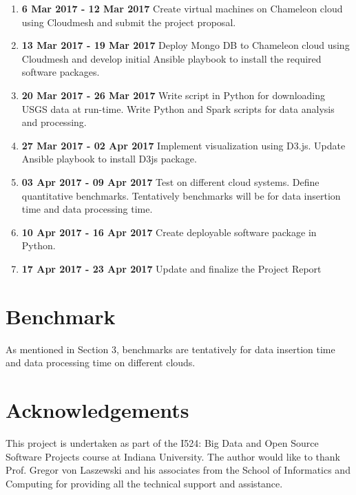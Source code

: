 \documentclass[9pt,twocolumn,twoside]{../../styles/osajnl}
\begin{document}
\begin{enumerate}

\item {\bfseries 6 Mar 2017 - 12 Mar 2017} Create virtual machines on Chameleon
cloud using Cloudmesh and submit the project proposal.

\item {\bfseries 13 Mar 2017 - 19 Mar 2017} Deploy Mongo DB to Chameleon
cloud using Cloudmesh and develop initial Ansible playbook to install the required software packages.

\item {\bfseries 20 Mar 2017 - 26 Mar 2017} Write script in Python for downloading USGS data at run-time. Write Python and Spark scripts for data analysis and processing.  

\item {\bfseries 27 Mar 2017 - 02 Apr 2017} Implement visualization using D3.js. Update Ansible playbook to install D3js package. 

\item {\bfseries 03 Apr 2017 - 09 Apr 2017} Test on different cloud systems. Define quantitative benchmarks. Tentatively benchmarks will be for data insertion time and data processing time.

\item {\bfseries 10 Apr 2017 - 16 Apr 2017} Create deployable software package
in Python.

\item {\bfseries 17 Apr 2017 - 23 Apr 2017} Update and finalize the Project Report
\end{enumerate}

\section{Benchmark}

As mentioned in Section 3, benchmarks are tentatively for data insertion time and data processing time on different clouds.  

\section {Acknowledgements}

This project is undertaken as part of the I524: Big Data and Open Source Software Projects course at Indiana University. The author would like to thank Prof. Gregor von Laszewski and his associates from the School of Informatics and Computing for providing all the technical support and assistance.
\end{document}
